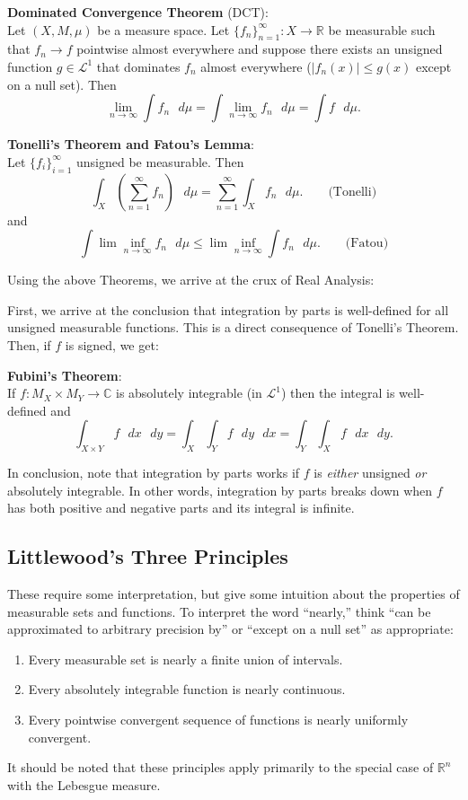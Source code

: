 \documentclass[12pt]{article}
\begin{document}
\textbf{Dominated Convergence Theorem} (DCT):\\
Let $(X, M, \mu)$ be a measure space.
Let $\{f_n\}_{n=1}^\infty : X \rightarrow \mathbb{R}$ be measurable
such that $f_n \rightarrow f$ pointwise almost everywhere and
suppose there exists an unsigned function $g \in \mathcal{L}^1$ that dominates 
$f_n$ almost everywhere ($|f_n(x)| \leq g(x)$ except on a null set).
Then 
$$
\lim_{n\rightarrow\infty} \int f_n \text{ }d\mu
= \int \lim_{n\rightarrow\infty} f_n \text{ }d\mu 
= \int f\text{ } d\mu.
$$

\textbf{Tonelli's Theorem and Fatou's Lemma}:\\
Let $\{f_i\}_{i=1}^\infty$ unsigned be measurable.
Then
$$
\int_X \left(\sum_{n=1}^\infty f_n\right)\text{ }d\mu 
= \sum_{n=1}^\infty \int_X f_n\text{ }d\mu. \qquad\text{(Tonelli)}
$$
and
$$
\int \lim \inf_{n\rightarrow\infty} f_n\text{ }d\mu 
\leq \lim\inf_{n\rightarrow\infty} \int f_n\text{ }d\mu.\qquad\text{(Fatou)}
$$

Using the above Theorems, we arrive at the crux of Real Analysis:

First, we arrive at the conclusion that integration by parts is well-defined
for all unsigned measurable functions. This is a direct consequence of
Tonelli's Theorem.
Then, if $f$ is signed, we get:

\textbf{Fubini's Theorem}:\\
If $f : M_X \times M_Y \rightarrow \mathbb{C}$ is absolutely integrable 
(in $\mathcal{L}^1$) then the integral is well-defined and
$$
\int_{X\times Y} f \text{ }dx\text{ }dy
=\int_X \int_Y f\text{ }dy\text{ }dx
=\int_Y \int_X f\text{ }dx\text{ }dy.
$$

In conclusion, note that integration by parts works if $f$ is {\it either}
unsigned {\it or} absolutely integrable.
In other words, integration by parts breaks down when $f$ has both positive
and negative parts and its integral is infinite.

\subsection*{Littlewood's Three Principles}

These require some interpretation, but give some intuition about the
properties of measurable sets and functions.
To interpret the word ``nearly,'' think 
``can be approximated to arbitrary precision by'' or 
``except on a null set'' as appropriate:
\begin{enumerate}
\item Every measurable set is nearly a finite union of intervals.
\item Every absolutely integrable function is nearly continuous.
\item Every pointwise convergent sequence of functions is nearly uniformly
convergent.
\end{enumerate}
It should be noted that these principles apply primarily to the special case of 
$\mathbb{R}^n$ with the Lebesgue measure.
\end{document}
